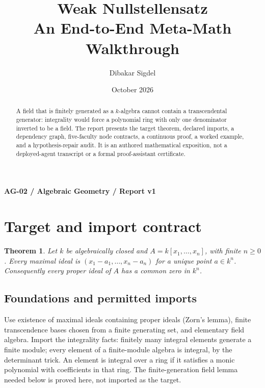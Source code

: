 \documentclass[preprint,12pt,aps,pra,showkeys,amsmath,amssymb,superscriptaddress,floatfix]{revtex4-2}
\newtheorem{theorem}{Theorem}[section]
\theoremstyle{definition}
\theoremstyle{remark}
\begin{document}
\title{Weak Nullstellensatz\\[4pt]\large An End-to-End Meta-Math Walkthrough}

\author{Dibakar Sigdel}


\date{October 2026}

\begin{abstract}

A field that is finitely generated as a \(k\)-algebra cannot contain a
transcendental generator: integrality would force a polynomial ring with
only one denominator inverted to be a field. The report presents the
target theorem, declared imports, a dependency graph, five-faculty node
contracts, a continuous proof, a worked example, and a hypothesis-repair
audit. It is an authored mathematical exposition, not a deployed-agent
transcript or a formal proof-assistant certificate.

\end{abstract}\maketitle\linespread{1.12}\selectfont

\noindent\textbf{AG-02 / Algebraic Geometry / Report v1}

\section{Target and import contract}

\begin{theorem}

Let \(k\) be algebraically closed and \(A=k[x_1,\ldots,x_n]\), with
finite \(n\ge0\). Every maximal ideal is \((x_1-a_1,\ldots,x_n-a_n)\)
for a unique point \(a\in k^n\). Consequently every proper ideal of
\(A\) has a common zero in \(k^n\).

\end{theorem}

\subsection{Foundations and permitted imports}

Use existence of maximal ideals containing proper ideals (Zorn's lemma),
finite transcendence bases chosen from a finite generating set, and
elementary field algebra. Import the integrality facts: finitely many
integral elements generate a finite module; every element of a
finite-module algebra is integral, by the determinant trick. An element
is integral over a ring if it satisfies a monic polynomial with
coefficients in that ring. The finite-generation field lemma needed
below is proved here, not imported as the target.
\end{document}
